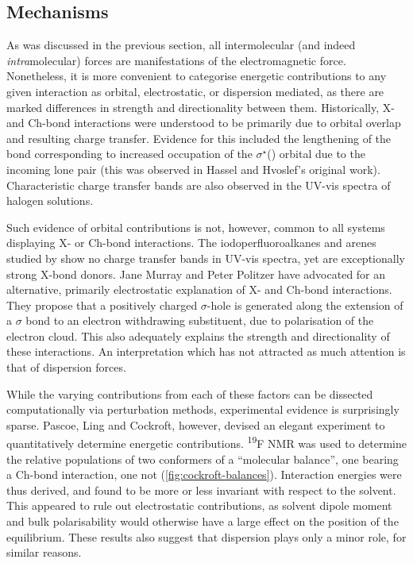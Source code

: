 \begin{refsection}
\subsection{Mechanisms}
As was discussed in the previous section, all intermolecular (and indeed \emph{intra}mole\-cular) forces are manifestations of the electromagnetic force.
Nonetheless, it is more convenient to categorise energetic contributions to any given interaction as orbital, electrostatic, or dispersion mediated, as there are marked differences in strength and directionality between them.
Historically, X- and Ch-bond interactions were understood to be primarily due to orbital overlap and resulting charge transfer.
Evidence for this included the lengthening of the  bond corresponding to increased occupation of the $\sigma^{\star}$() orbital due to the incoming lone pair (this was observed in Hassel and Hvoslef's original work\autocite{Hassel1954}).
Characteristic charge transfer bands are also observed in the UV-vis spectra of halogen solutions.\autocite{Blackstock1987}

Such evidence of orbital contributions is not, however, common to all systems displaying X- or Ch-bond interactions.
The iodoperfluoroalkanes and arenes studied by \citeauthor{Yan2014} show no charge transfer bands in UV-vis spectra, yet are exceptionally strong X-bond donors.\autocite{Yan2014}
Jane Murray and Peter Politzer have advocated for an alternative, primarily electrostatic explanation of X- and Ch-bond interactions.\autocite{Murray2008,Murray2009}
They propose that a positively charged $ \sigma $-hole is generated along the extension of a $ \sigma $ bond to an electron withdrawing substituent, due to polarisation of the electron cloud.
This also adequately explains the strength and directionality of these interactions.
An interpretation which has not attracted as much attention is that of dispersion forces.

While the varying contributions from each of these factors can be dissected computationally via perturbation methods, experimental evidence is surprisingly sparse.
Pascoe, Ling and Cockroft, however, devised an elegant experiment to quantitatively determine energetic contributions.\autocite{Pascoe2017}
\textsuperscript{19}F NMR was used to determine the relative populations of two conformers of a ``molecular balance'', one bearing a Ch-bond interaction, one not (\cref{fig:cockroft-balances}).
Interaction energies were thus derived, and found to be more or less invariant with respect to the solvent.
This appeared to rule out electrostatic contributions, as solvent dipole moment and bulk polarisability would otherwise have a large effect on the position of the equilibrium.
These results also suggest that dispersion plays only a minor role, for similar reasons.


\end{refsection}
